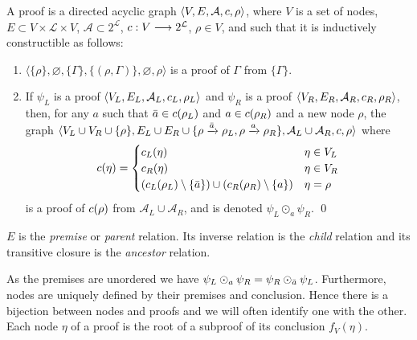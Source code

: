 \documentclass{llncs}
\begin{document}
\begin{definition}[Proof] \label{def:proof}
A proof is a directed acyclic graph
$\langle 
V, 
E, 
\mathcal{A},
c, 
\rho
\rangle$, 
where $V$ is a set of nodes, $E \subset V \times \mathcal{L} \times V$, 
$\mathcal{A} \subset 2^\mathcal{L}$,
$c : V \longrightarrow 2^\mathcal{L}$, 
$\rho \in V$, and such that it is inductively constructible as follows:
\begin{enumerate}
  \item $\langle \{\rho\}, \varnothing, \{ \Gamma \}, \{ (\rho, \Gamma) \}, \varnothing,  \rho \rangle$ 
    is a proof of $\Gamma$ from $\{ \Gamma \}$.
  \item If $\psi_L$ is a proof $\langle V_L, E_L, \mathcal{A}_L, c_L, \rho_L \rangle$ and
    $\psi_R$ is a proof $\langle V_R, E_R, \mathcal{A}_R, c_R, \rho_R \rangle$, then, for any $a$ such that $\bar{a} \in c(\rho_L)$ and $a
    \in c(\rho_R)$ and a new node $\rho$, the graph 
    $\langle 
    V_L \cup V_R \cup \{\rho\},
    E_L \cup E_R \cup \{\rho \xrightarrow{\bar{a}} \rho_L, \rho \xrightarrow{a} \rho_R\}, 
    \mathcal{A}_L \cup \mathcal{A}_R,
    c,
    \rho
    \rangle$ where
    \begin{equation*}
      c(\eta) = \begin{cases}
        c_L(\eta) & \eta \in V_L \\
        c_R(\eta) & \eta \in V_R \\
        (c_L(\rho_L) \setminus \{\bar{a}\}) \cup (c_R(\rho_R) \setminus \{a\}) &
          \eta = \rho
      \end{cases}
    \end{equation*}
    is a proof of $c(\rho)$ from $\mathcal{A}_L \cup \mathcal{A}_R$, and is denoted $\psi_L \odot_a \psi_R$.
  \qed
\end{enumerate}
\end{definition}


 $E$ is the \emph{premise} or \emph{parent} relation. Its inverse relation is the \emph{child} relation and its
transitive closure is the \emph{ancestor} relation.  

As the premises are unordered we have $\psi_L \odot_a \psi_R = \psi_R \odot_{\bar{a}} \psi_L$.
Furthermore, nodes are uniquely defined by their premises and conclusion. Hence there is a bijection
between nodes and proofs and we will often identify one with the other. Each node $\eta$ of a proof
is the root of a subproof of its conclusion $f_V(\eta)$.
\end{document}
